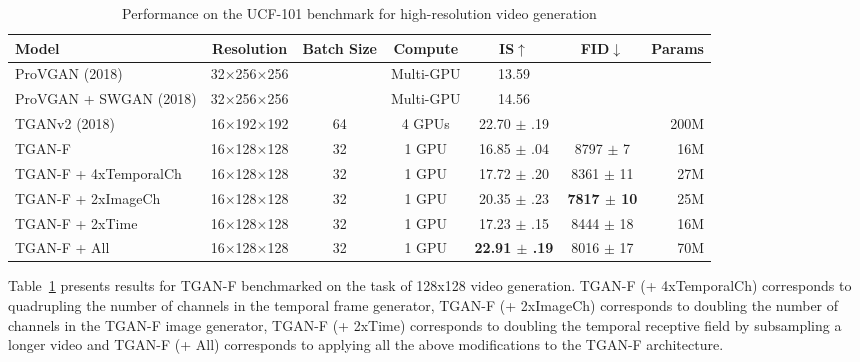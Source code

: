 \documentclass[a4paper,fleqn]{cas-sc}
\begin{document}
\begin{table}[pos=!h]
\centering
\caption{Performance on the UCF-101 benchmark for high-resolution video generation}
\label{table:tgan_is128}
    \begin{tabular}{lcccccr}
    \hline Model                                                   &   Resolution                      &  Batch Size   &     Compute   &   IS$\uparrow$    &     FID$\downarrow$                   & Params  \\
    \hline
    ProVGAN \cite{AcharyaHPG2018towards} (2018)             &   32$\times$256$\times$256        &               &    Multi-GPU  &     13.59                 &                           &    \\
ProVGAN + SWGAN \cite{AcharyaHPG2018towards} (2018)     &   32$\times$256$\times$256        &               &   Multi-GPU   &    14.56                  &                           &   \\
TGANv2  \cite{saito2018tganv2} (2018)                   &   16$\times$192$\times$192        &     64        &    4 GPUs     & 22.70 $\pm$ .19           &                           &  200M \\
    \hline
    TGAN-F                                                  &   16$\times$128$\times$128        &     32        &   1 GPU       & 16.85 $\pm$ .04  & 8797 $\pm$ 7   &  16M \\
    TGAN-F + 4xTemporalCh                                   &   16$\times$128$\times$128        &     32        &   1 GPU       & 17.72 $\pm$ .20  & 8361 $\pm$ 11   &   27M \\
    TGAN-F + 2xImageCh                                      &   16$\times$128$\times$128        &     32        &   1 GPU       & 20.35 $\pm$ .23  & \textbf{7817 $\pm$ 10}   &   25M \\
    TGAN-F + 2xTime                                         &   16$\times$128$\times$128        &     32        &   1 GPU       & 17.23 $\pm$ .15  & 8444 $\pm$ 18   &   16M \\
    \hline
    TGAN-F + All                                          &   16$\times$128$\times$128        &     32        &   1 GPU       & \textbf{22.91 $\pm$ .19}        &  8016 $\pm$ 17       &   70M \\
    \hline \end{tabular}
\end{table}

Table~\ref{table:tgan_is128} presents results for TGAN-F benchmarked on the task of 128x128 video generation. TGAN-F (+ 4xTemporalCh) corresponds to quadrupling the number of channels in the temporal frame generator, TGAN-F (+ 2xImageCh) corresponds to doubling the number of channels in the TGAN-F image generator, TGAN-F (+ 2xTime) corresponds to doubling the temporal receptive field by subsampling a longer video and TGAN-F (+ All) corresponds to applying all the above modifications to the TGAN-F architecture. 
\end{document}
